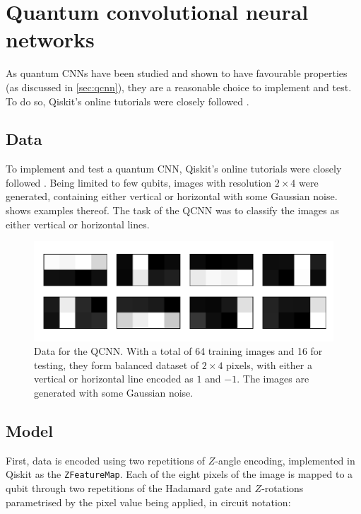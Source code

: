 \section{Quantum convolutional neural networks}
\label{sec:qcnn1}
As quantum CNNs have been studied and shown to have favourable properties (as discussed in \cref{sec:qcnn}), they are a reasonable choice to implement and test.
To do so, Qiskit's online tutorials were closely followed \cite{qiskit_qcnn}.

\subsection{Data}
To implement and test a quantum CNN, Qiskit's online tutorials were closely followed \cite{qiskit_qcnn}.
Being limited to few qubits, images with resolution $2\times4$ were generated, containing either vertical or horizontal with some Gaussian noise.
 shows examples thereof.
The task of the QCNN was to classify the images as either vertical or horizontal lines.

\begin{figure}
    \centering
    \includegraphics[width=\textwidth]{../code/qcnn/data.pdf}
    \caption{
        Data for the QCNN.
        With a total of 64 training images and 16 for testing, they form balanced dataset of $2\times4$ pixels, with either a vertical or horizontal line encoded as $1$ and $-1$.
        The images are generated with some Gaussian noise.
    }
    \label{fig:qcnn_data}
\end{figure}

\subsection{Model}
First, data is encoded using two repetitions of $Z$-angle encoding, implemented in Qiskit as the \texttt{ZFeatureMap}.
Each of the eight pixels of the image is mapped to a qubit through two repetitions of the Hadamard gate and $Z$-rotations parametrised by the pixel value being applied, in circuit notation:

